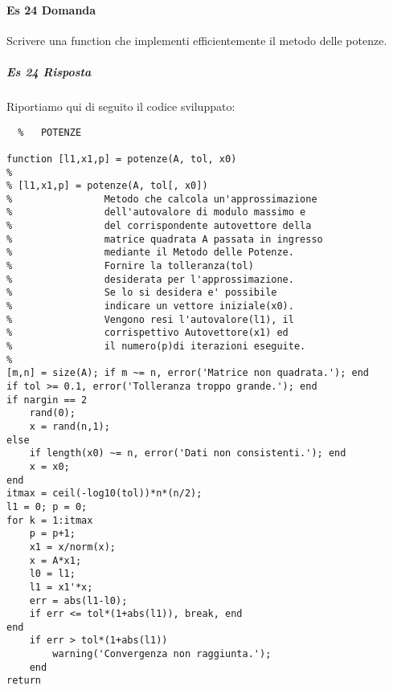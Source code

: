 \documentclass[a4paper]{report}
\begin{document}
\paragraph{Es 24 Domanda}
Scrivere una function che implementi efficientemente il metodo delle potenze.
\subparagraph{Es 24 Risposta}
Riportiamo qui di seguito il codice sviluppato:
\begin{lstlisting}	%	POTENZE

function [l1,x1,p] = potenze(A, tol, x0)
%
% [l1,x1,p] = potenze(A, tol[, x0]) 
%                Metodo che calcola un'approssimazione  
%                dell'autovalore di modulo massimo e
%                del corrispondente autovettore della
%                matrice quadrata A passata in ingresso
%                mediante il Metodo delle Potenze.
%                Fornire la tolleranza(tol)
%                desiderata per l'approssimazione.
%                Se lo si desidera e' possibile
%                indicare un vettore iniziale(x0).
%                Vengono resi l'autovalore(l1), il 
%                corrispettivo Autovettore(x1) ed 
%                il numero(p)di iterazioni eseguite.
%
[m,n] = size(A); if m ~= n, error('Matrice non quadrata.'); end
if tol >= 0.1, error('Tolleranza troppo grande.'); end
if nargin == 2
	rand(0);
	x = rand(n,1);
else
	if length(x0) ~= n, error('Dati non consistenti.'); end
	x = x0;
end
itmax = ceil(-log10(tol))*n*(n/2);
l1 = 0; p = 0;
for k = 1:itmax
	p = p+1;
	x1 = x/norm(x);
	x = A*x1;
	l0 = l1;
	l1 = x1'*x;
	err = abs(l1-l0);
	if err <= tol*(1+abs(l1)), break, end
end
	if err > tol*(1+abs(l1))
		warning('Convergenza non raggiunta.');
	end
return
\end{lstlisting}
\newpage
\end{document}
